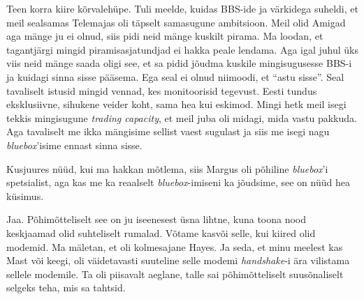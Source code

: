 Teen korra kiire kõrvalehüpe. Tuli meelde, kuidas BBS-ide ja värkidega suheldi, et meil sealsamas Telemajas oli täpselt samasugune ambitsioon. Meil olid Amigad aga mänge ju ei olnud, siis pidi neid mänge kuskilt pirama. Ma loodan, et tagantjärgi mingid piramisasjatundjad ei hakka peale lendama. Aga igal juhul üks viis neid mänge saada oligi see, et sa pidid jõudma kuskile mingisugusesse BBS-i ja kuidagi sinna sisse pääsema. Ega seal ei olnud niimoodi, et \enquote{astu sisse}. Seal tavaliselt istusid mingid vennad, kes monitoorisid tegevust. Eesti tundus eksklusiivne, sihukene veider koht, sama hea kui eskimod. Mingi hetk meil isegi tekkis mingisugune \emph{trading capacity}, et meil juba oli midagi, mida  vastu pakkuda. Aga tavaliselt me ikka mängisime sellist vaest sugulast ja siis me isegi nagu \emph{bluebox}'isime ennast sinna sisse. 


Kusjuures nüüd, kui ma hakkan mõtlema, siis Margus oli põhiline \emph{bluebox}'i spetsialist, aga kas me ka reaalselt \emph{bluebox}-imiseni ka jõudsime, see on nüüd hea küsimus.


Jaa. Põhimõtteliselt see on ju iseenesest üsna lihtne, kuna toona nood keskjaamad olid suhteliselt rumalad.  Võtame kasvõi selle, kui kiired olid modemid. Ma mäletan, et oli kolmesajane Hayes. Ja seda, et minu meelest kas Mast või keegi, oli väidetavasti suuteline selle modemi \emph{handshake}-i ära vilistama sellele modemile. Ta  oli  piisavalt aeglane, talle sai põhimõtteliselt suusõnaliselt selgeks teha, mis sa tahtsid.

